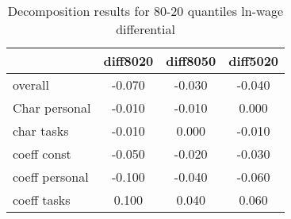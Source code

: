 \begin{table}[htbp]
\caption{\label{Tab:results_8020_decomp} Decomposition results for 80-20 quantiles ln-wage differential}\centering\medskip
\begin{tabular}{lccc} \hline \hline
 & diff8020  & diff8050  & diff5020  \\  \hline 
overall &  -0.070 &  -0.030 &  -0.040 \\  
Char personal &  -0.010 &  -0.010 &   0.000 \\  
char tasks &  -0.010 &   0.000 &  -0.010 \\  
coeff const &  -0.050 &  -0.020 &  -0.030 \\  
coeff personal &  -0.100 &  -0.040 &  -0.060 \\  
coeff tasks &   0.100 &   0.040 &   0.060 \\  
\hline \hline \end{tabular}
\end{table}
